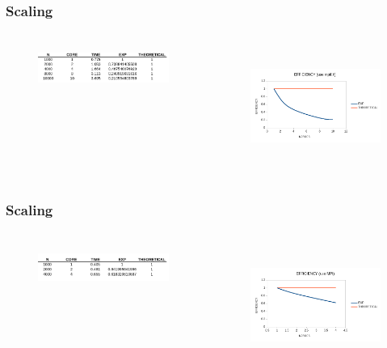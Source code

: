 \documentclass{beamer}
\begin{document}
    \begin{frame}
        \frametitle{Scaling}
        
        \begin{columns}
            \begin{figure}
                \includegraphics[height = 15mm,width = 50mm]{scaleBStable.png}             
            \end{figure}       
    
            \begin{figure}
                \includegraphics[height = 40mm,width = 50mm]{scaleBSplot.png}            
            \end{figure}       
            \end{columns}
    \end{frame}


    \begin{frame}
        \frametitle{Scaling}
        
        \begin{columns}
            \begin{figure}
                \includegraphics[height = 15mm,width = 50mm]{scaleMPItable.png}             
            \end{figure}       
    
            \begin{figure}
                \includegraphics[height = 40mm,width = 50mm]{scaleMPIplot.png}       
            \end{figure}       
            \end{columns}
    \end{frame}
\end{document}
